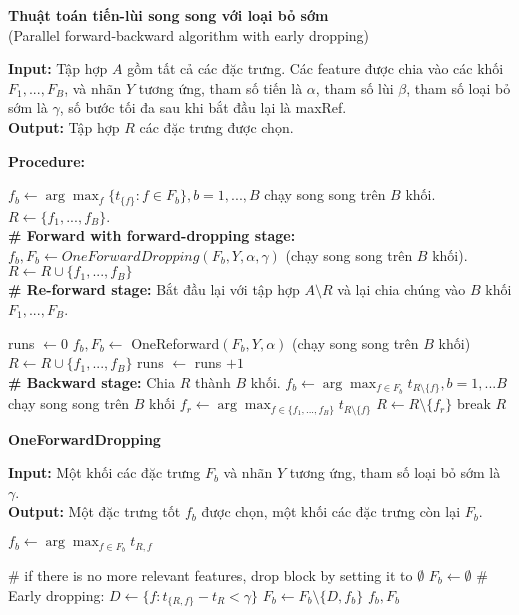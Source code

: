 \begin{breakablealgorithm}
	\caption{\textbf{Thuật toán tiến-lùi song song với loại bỏ sớm}\\
		(Parallel forward-backward algorithm with early dropping)}\label{alg:pfbaed}
	\noindent\textbf{Input:} Tập hợp $A$ gồm tất cả các đặc trưng. Các feature được chia vào các khối $F_1,..., F_B$, và nhãn $Y$ tương ứng, tham số tiến là $\alpha$, tham số lùi $\beta$, tham số loại bỏ sớm là $\gamma$, số bước tối đa sau khi bắt đầu lại là maxRef.\\
	\textbf{Output:} Tập hợp $R$ các đặc trưng được chọn.
	
	\hspace*{\algorithmicindent}
	\textbf{Procedure:}
	\begin{algorithmic}[1]
		\State $f_b \gets \arg\max_f \{t_{\{f\}}: f\in F_b \}, b=1,...,B$ chạy song song trên $B$ khối.
		\State $R \gets \{f_1,...,f_B\}$.\\
		\textbf{\# Forward with forward-dropping stage:}
		\State $f_b,F_b \gets OneForwardDropping(F_b,Y,\alpha,\gamma)$ (chạy song song trên $B$ khối).
		\State $R \gets R\cup \{f_1,..., f_B\}$ 
		\EndWhile\\
		\textbf{\# Re-forward stage:}
		\State Bắt đầu lại với tập hợp $A\setminus R$ và lại chia chúng vào $B$ khối $F_1,..., F_B$.
		
		\State runs $\gets 0$
		\State $f_b,F_b \gets$ OneReforward$(F_b,Y,\alpha)$ (chạy song song trên $B$ khối)
		\State $R \gets R\cup \{f_1,..., f_B\}$
		\State runs $\gets$ runs $+1$
		\EndWhile\\
		\textbf{\# Backward stage:}
		\State Chia $R$ thành $B$ khối.
		\State $f_b \gets \arg \max_{f\in F_b} t_{R\setminus\{f\}}, b=1,...B$ chạy song song trên $B$ khối
		\State $f_r \gets \arg \max_{f\in \{f_1,...,f_B\}} t_{R\setminus \{f\}}$
		\State $R \gets R\setminus \{f_r\}$
		\Else
		\State break
		\EndIf
		\State \Return $R$
	\end{algorithmic}
\end{breakablealgorithm}

\begin{breakablealgorithm}
	\caption{\textbf{OneForwardDropping} }\label{alg:ofd}
	\noindent\textbf{Input:} Một khối các đặc trưng $F_b$ và nhãn $Y$ tương ứng, tham số loại bỏ sớm là $\gamma$.\\
	\textbf{Output:} Một đặc trưng tốt $f_b$ được chọn, một khối các đặc trưng còn lại $F_b$.
	\begin{algorithmic}[1]
		\State $f_b \gets \arg\max_{f\in F_b}	t_{R,f}	$
		
		\State \# if there is no more relevant features, drop block by setting it to  $\emptyset$
		\State $F_b\gets \emptyset$
		\Else
		\State \# Early dropping:
		\State $D \gets \{f:t_{\{R,f\}}-t_R<\gamma  \}$
		\State $F_b \gets F_b\setminus \{D, f_b \} $
		\EndIf
		\State \Return $f_b,F_b$
	\end{algorithmic}
\end{breakablealgorithm}

